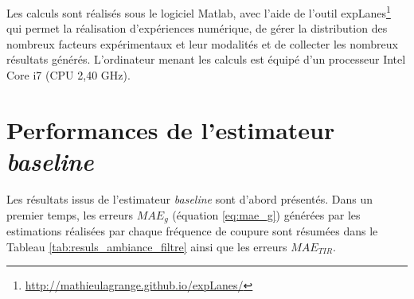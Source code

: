 Les calculs sont réalisés sous le logiciel Matlab, avec l'aide de l'outil expLanes\footnote{\url{http://mathieulagrange.github.io/expLanes/}} qui permet la réalisation d'expériences numérique, de gérer la distribution des nombreux facteurs expérimentaux et leur modalités et de collecter les nombreux résultats générés. L'ordinateur menant les calculs est équipé d'un processeur Intel Core i7 (CPU 2,40 GHz).

\section{Performances de l'estimateur \textit{baseline}}

Les résultats issus de l'estimateur \textit{baseline} sont d'abord présentés. Dans un premier temps, les erreurs $MAE_g$ (équation \ref{eq:mae_g}) générées par les estimations réalisées par chaque fréquence de coupure sont résumées dans le Tableau \ref{tab:resuls_ambiance_filtre} ainsi que les erreurs $MAE_{TIR}$.  

\begin{table}[h]
\centering
\caption{Erreurs $MAE_g$ de l'estimateur \textit{baseline} selon $f_c$ sur l'ensemble du corpus \textit{Ambiance} et pour chaque $TIR$. En gras-rouge l'erreur $MAE_g$ la plus faible, en gras-noir, les erreurs $MAE_{TIR}$ les plus faibles selon les fréquences $f_c$.}
\label{tab:resuls_ambiance_filtre}
\end{table}

